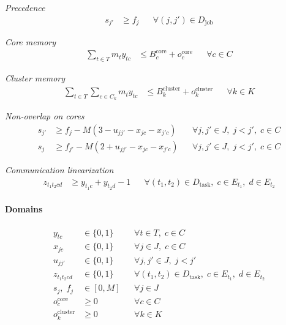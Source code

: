 \documentclass[11pt,a4paper]{article}
\begin{document}
\textit{Precedence}
\begin{align}
s_{j'} &\ge f_j
&& \forall (j,j') \in D_{\mathrm{job}}
\end{align}

\textit{Core memory}
\begin{align}
\sum_{t \in T} m_t y_{tc}
&\le B_c^{\mathrm{core}} + o_c^{\mathrm{core}}
&& \forall c \in C
\end{align}

\textit{Cluster memory}
\begin{align}
\sum_{t \in T} \sum_{c \in C_k} m_t y_{tc}
&\le B_k^{\mathrm{cluster}} + o_k^{\mathrm{cluster}}
&& \forall k \in K
\end{align}

\textit{Non-overlap on cores}
\begin{align}
s_{j'}
&\ge
f_j - M\left(3 - u_{jj'} - x_{jc} - x_{j'c}\right)
&& \forall j,j' \in J,\; j<j',\; c \in C \\
s_j
&\ge
f_{j'} - M\left(2 + u_{jj'} - x_{jc} - x_{j'c}\right)
&& \forall j,j' \in J,\; j<j',\; c \in C
\end{align}

\textit{Communication linearization}
\begin{align}
z_{t_1t_2cd}
&\ge
y_{t_1c} + y_{t_2d} - 1
&& \forall (t_1,t_2)\in D_{\mathrm{task}},\;
c\in E_{t_1},\;
d\in E_{t_2}
\end{align}

\paragraph{Domains}
\begin{align}
y_{tc} &\in \{0,1\}
&& \forall t \in T,\; c \in C \\
x_{jc} &\in \{0,1\}
&& \forall j \in J,\; c \in C \\
u_{jj'} &\in \{0,1\}
&& \forall j,j' \in J,\; j<j' \\
z_{t_1t_2cd} &\in \{0,1\}
&& \forall (t_1,t_2)\in D_{\mathrm{task}},\;
c\in E_{t_1},\;
d\in E_{t_2} \\
s_j,\; f_j &\in [0,M]
&& \forall j \in J \\
o_c^{\mathrm{core}} &\ge 0
&& \forall c \in C \\
o_k^{\mathrm{cluster}} &\ge 0
&& \forall k \in K
\end{align}
\end{document}
